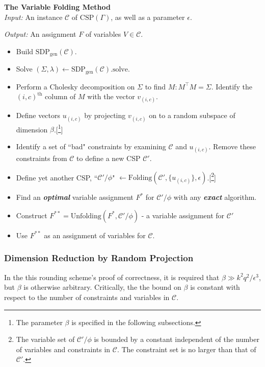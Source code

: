 \documentclass[letterpaper, 12pt]{article}
\numberwithin{equation}{section}
\begin{document}
\begin{algorithm} \textbf{The Variable Folding Method} \\

\textit{Input: } An instance $\mathcal{C}$ of $\text{CSP}(\Gamma)$, as well as a parameter $\epsilon$.

\textit{Output: } An assignment $F$ of variables $V \in \mathcal{C}$.
\begin{itemize}
\item Build $\text{SDP}_{\text{gen}}(\mathcal{C})$.
\item Solve $(\Sigma,\lambda) \leftarrow \text{SDP}_{\text{gen}}(\mathcal{C}).\text{solve}$.
\item Perform a Cholesky decomposition on $\Sigma$ to find $M : M^\intercal M = \Sigma$. Identify the $(i,c)^{\text{th}}$ column of $M$ with the vector $v_{(i,c)}$.
\item Define vectors $u_{(i,c)}$ by projecting $v_{(i,c)}$ on to a random subspace of dimension $\beta$.[\footnote{The parameter $\beta$ is specified in the following subsections.}]
\item Identify a set of ``bad" constraints by examining $\mathcal{C}$ and $u_{(i,c)}$. Remove these constraints from $\mathcal{C}$ to define a new CSP $\mathcal{C}'$.
\item Define yet another CSP, ``$\mathcal{C}'/\phi$" $\leftarrow \text{Folding}(\mathcal{C}',\{u_{(i,c)}\},\epsilon)$.[\footnote{The variable set of  $\mathcal{C}'/\phi$ is bounded by a constant independent of the number of variables and constraints in $\mathcal{C}$. The constraint set is no larger than that of $\mathcal{C}'$.}]
\item Find an \textit{\textbf{optimal}} variable assignment $F^*$ for $\mathcal{C}'/\phi$ with any \textit{\textbf{exact}} algorithm.
\item Construct $F^{**} = \text{Unfolding}(F^*, \mathcal{C}'/\phi)$ - a variable assignment for $\mathcal{C}'$
\item Use $F^{**}$ as an assignment of variables for $\mathcal{C}$.
\end{itemize}
\end{algorithm}

\subsubsection{Dimension Reduction by Random Projection}
In the this rounding scheme's proof of correctness, it is required that $ \beta \gg k^2q^2/\epsilon^3$, but $\beta$ is otherwise arbitrary. Critically, the the bound on $\beta$ is constant with respect to the number of constraints and variables in $\mathcal{C}$. 
\end{document}
